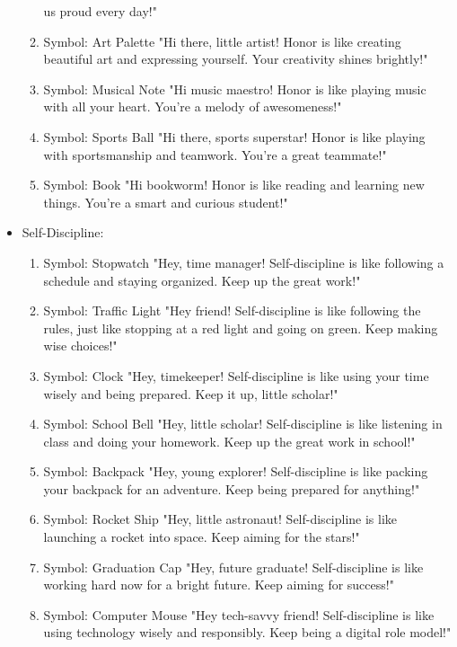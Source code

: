 \documentclass[11pt]{article}
\begin{document}
\begin{itemize}
\begin{enumerate}
us proud every day!"
\item Symbol: Art Palette
"Hi there, little artist! Honor is like creating beautiful art and expressing
yourself. Your creativity shines brightly!"
\item Symbol: Musical Note
"Hi music maestro! Honor is like playing music with all your heart. You're a
melody of awesomeness!"
\item Symbol: Sports Ball
"Hi there, sports superstar! Honor is like playing with sportsmanship and
teamwork. You're a great teammate!"
\item Symbol: Book
"Hi bookworm! Honor is like reading and learning new things. You're a smart and
curious student!"
\end{enumerate}
\item Self-Discipline:
\begin{enumerate}
\item Symbol: Stopwatch
"Hey, time manager! Self-discipline is like following a schedule and staying
organized. Keep up the great work!"
\item Symbol: Traffic Light
"Hey friend! Self-discipline is like following the rules, just like stopping at a
red light and going on green. Keep making wise choices!"
\item Symbol: Clock
"Hey, timekeeper! Self-discipline is like using your time wisely and being
prepared. Keep it up, little scholar!"
\item Symbol: School Bell
"Hey, little scholar! Self-discipline is like listening in class and doing your
homework. Keep up the great work in school!"
\item Symbol: Backpack
"Hey, young explorer! Self-discipline is like packing your backpack for an
adventure. Keep being prepared for anything!"
\item Symbol: Rocket Ship
"Hey, little astronaut! Self-discipline is like launching a rocket into space.
Keep aiming for the stars!"
\item Symbol: Graduation Cap
"Hey, future graduate! Self-discipline is like working hard now for a bright
future. Keep aiming for success!"
\item Symbol: Computer Mouse
"Hey tech-savvy friend! Self-discipline is like using technology wisely and
responsibly. Keep being a digital role model!"
\end{enumerate}
\end{itemize}
\end{document}
